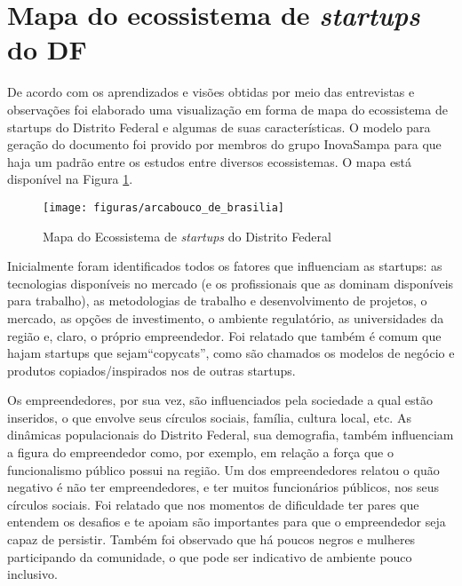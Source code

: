 \section{Mapa do ecossistema de \textit{startups} do DF}
\label{mapa_do_ecossistema_do_distrito_federal}

De acordo com os aprendizados e visões obtidas por meio das entrevistas e observações foi elaborado uma visualização em forma de mapa do ecossistema de startups do Distrito Federal e algumas de suas características. O modelo para geração do documento foi provido por membros do grupo InovaSampa para que haja um padrão entre os estudos entre diversos ecossistemas. O mapa está disponível na Figura \ref{figure:mapa_do_ecossistema}.

\begin{figure}[!htb]
	\centering
	\texttt{[image: figuras/arcabouco\_de\_brasilia]}
	\caption{Mapa do Ecossistema de \textit{startups} do Distrito Federal}
	\label{figure:mapa_do_ecossistema}
\end{figure} 

Inicialmente foram identificados todos os fatores que influenciam as startups: as tecnologias disponíveis no mercado (e os profissionais que as dominam disponíveis para trabalho), as metodologias de trabalho e desenvolvimento de projetos, o mercado, as opções de investimento, o ambiente regulatório, as universidades da região e, claro, o próprio empreendedor. Foi relatado que também é comum que hajam startups que sejam``copycats'', como são chamados os modelos de negócio e produtos copiados/inspirados nos de outras startups.

Os empreendedores, por sua vez, são influenciados pela sociedade a qual estão inseridos, o que envolve seus círculos sociais, família, cultura local, etc. As dinâmicas populacionais do Distrito Federal, sua demografia, também influenciam a figura do empreendedor como, por exemplo, em relação a força que o funcionalismo público possui na região. Um dos empreendedores relatou o quão negativo é não ter empreendedores, e ter muitos funcionários públicos, nos seus círculos sociais. Foi relatado que nos momentos de dificuldade ter pares que entendem os desafios e te apoiam são importantes para que o empreendedor seja capaz de persistir. Também foi observado que há poucos negros e mulheres participando da comunidade, o que pode ser indicativo de ambiente pouco inclusivo. 

